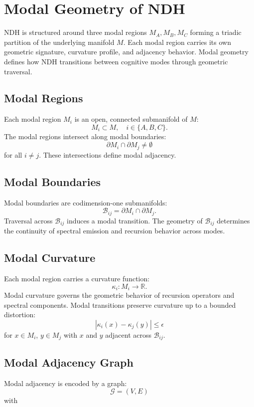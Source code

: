 \section{Modal Geometry of NDH}
\label{sec:ndh-modal-geometry}

NDH is structured around three modal regions $M_A, M_B, M_C$ forming a triadic
partition of the underlying manifold $M$. Each modal region carries its own
geometric signature, curvature profile, and adjacency behavior. Modal geometry
defines how NDH transitions between cognitive modes through geometric traversal.

\subsection{Modal Regions}

Each modal region $M_i$ is an open, connected submanifold of $M$:
\[
M_i \subset M, \quad i \in \{A, B, C\}.
\]
The modal regions intersect along modal boundaries:
\[
\partial M_i \cap \partial M_j \neq \emptyset
\]
for all $i \neq j$. These intersections define modal adjacency.

\subsection{Modal Boundaries}

Modal boundaries are codimension-one submanifolds:
\[
\mathcal{B}_{ij} = \partial M_i \cap \partial M_j.
\]
Traversal across $\mathcal{B}_{ij}$ induces a modal transition. The geometry of
$\mathcal{B}_{ij}$ determines the continuity of spectral emission and recursion
behavior across modes.

\subsection{Modal Curvature}

Each modal region carries a curvature function:
\[
\kappa_i : M_i \to \mathbb{R}.
\]
Modal curvature governs the geometric behavior of recursion operators and
spectral components. Modal transitions preserve curvature up to a bounded
distortion:
\[
|\kappa_i(x) - \kappa_j(y)| \le \epsilon
\]
for $x \in M_i$, $y \in M_j$ with $x$ and $y$ adjacent across $\mathcal{B}_{ij}$.

\subsection{Modal Adjacency Graph}

Modal adjacency is encoded by a graph:
\[
\mathcal{G} = (V, E)
\]
with
